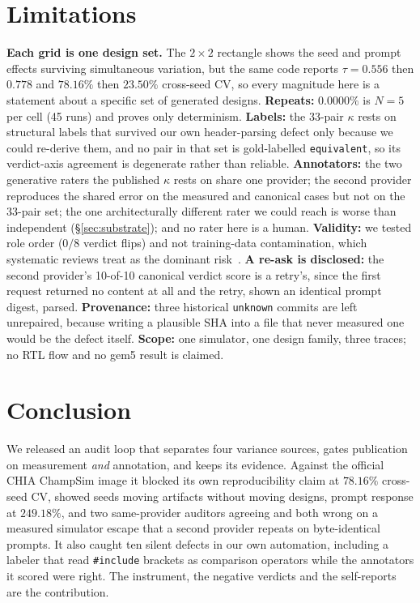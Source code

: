 \documentclass[sigconf,anonymous,nonacm]{acmart}
\begin{document}
\section{Limitations}
\textbf{Each grid is one design set.} The $2\times2$ rectangle shows the seed and prompt effects surviving simultaneous variation, but the same code reports $\tau=0.556$ then $0.778$ and $78.16\%$ then $23.50\%$ cross-seed CV, so every magnitude here is a statement about a specific set of generated designs. \textbf{Repeats:} $0.0000\%$ is $N=5$ per cell (45 runs) and proves only determinism. \textbf{Labels:} the 33-pair $\kappa$ rests on structural labels that survived our own header-parsing defect only because we could re-derive them, and no pair in that set is gold-labelled \texttt{equivalent}, so its verdict-axis agreement is degenerate rather than reliable. \textbf{Annotators:} the two generative raters the published $\kappa$ rests on share one provider; the second provider reproduces the shared error on the measured and canonical cases but not on the 33-pair set; the one architecturally different rater we could reach is worse than independent (\S\ref{sec:substrate}); and no rater here is a human. \textbf{Validity:} we tested role order ($0/8$ verdict flips) and not training-data contamination, which systematic reviews treat as the dominant risk~\cite{contamination}. \textbf{A re-ask is disclosed:} the second provider's 10-of-10 canonical verdict score is a retry's, since the first request returned no content at all and the retry, shown an identical prompt digest, parsed. \textbf{Provenance:} three historical \texttt{unknown} commits are left unrepaired, because writing a plausible SHA into a file that never measured one would be the defect itself. \textbf{Scope:} one simulator, one design family, three traces; no RTL flow and no gem5 result is claimed.

\section{Conclusion}
We released an audit loop that separates four variance sources, gates publication on measurement \emph{and} annotation, and keeps its evidence. Against the official CHIA ChampSim image it blocked its own reproducibility claim at $78.16\%$ cross-seed CV, showed seeds moving artifacts without moving designs, prompt response at $249.18\%$, and two same-provider auditors agreeing and both wrong on a measured simulator escape that a second provider repeats on byte-identical prompts. It also caught ten silent defects in our own automation, including a labeler that read \texttt{\#include} brackets as comparison operators while the annotators it scored were right. The instrument, the negative verdicts and the self-reports are the contribution.
\end{document}
